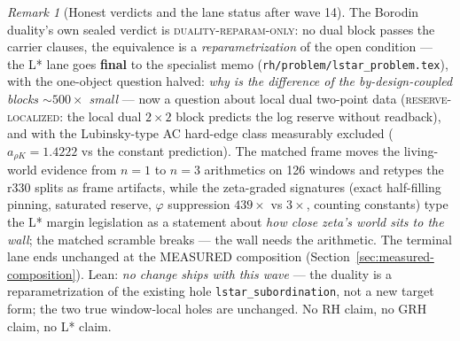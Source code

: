 \documentclass[11pt]{article}
\theoremstyle{definition}
\theoremstyle{remark}
\newtheorem{remark}[theorem]{Remark}
\begin{document}
\begin{remark}[Honest verdicts and the lane status after wave 14]
\label{rem:lanestatus-wave14}
The Borodin duality's own sealed verdict is
\textsc{duality-reparam-only}: no dual block passes the carrier
clauses, the equivalence is a \emph{reparametrization} of the open
condition --- the L* lane goes \textbf{final} to the specialist memo
(\texttt{rh/problem/lstar\_problem.tex}), with the one-object
question halved: \emph{why is the difference of the
by-design-coupled blocks $\sim 500\times$ small} --- now a question
about local dual two-point data (\textsc{reserve-localized}: the
local dual $2\times2$ block predicts the log reserve without
readback), and with the Lubinsky-type AC hard-edge class measurably
excluded ($a_{\rho K} = 1.4222$ vs the constant prediction).  The
matched frame moves the living-world evidence from $n = 1$ to
$n = 3$ arithmetics on 126 windows and retypes the r330 splits as
frame artifacts, while the zeta-graded signatures (exact half-filling
pinning, saturated reserve, $\varphi$ suppression $439\times$ vs
$3\times$, counting constants) type the L* margin legislation as a
statement about \emph{how close zeta's world sits to the wall}; the
matched scramble breaks --- the wall needs the arithmetic.  The
terminal lane ends unchanged at the MEASURED composition
(Section~\ref{sec:measured-composition}).  Lean: \emph{no change
ships with this wave} --- the duality is a reparametrization of the
existing hole \texttt{lstar\_subordination}, not a new target form;
the two true window-local holes are unchanged.  No RH claim, no GRH
claim, no L* claim.
\end{remark}
\end{document}
